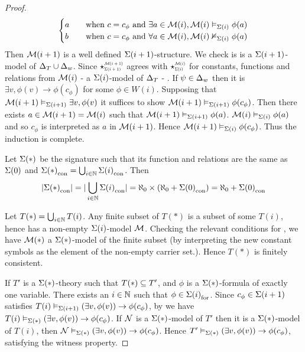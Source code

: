 \begin{proof}
\[\begin{cases}
            a \quad &\text{when } c = c_\phi \text{ and } 
            \exists a \in {\mathcal{M}(i)}, \mathcal{M}(i) \vDash_{\Sigma(i)} \phi(a)\\
            b \quad &\text{when } c = c_\phi \text{ and } 
            \forall a \in {\mathcal{M}(i)}, \mathcal{M}(i) \nvDash_{\Sigma(i)} \phi(a)
        \end{cases}
        \]
    Then $\mathcal{M}(i+1)$ is a well defined $\Sigma(i+1)$-structure.
    We check is is a $\Sigma(i+1)$-model of $\Delta_T \cup \Delta_w$.
    Since 
    $\intp{\Si(i+1)}{\MM(i+1)}$ agrees with 
    $\intp{\Si(i)}{\MM(i)}$ for constants, 
    functions and relations from $\mathcal{M}(i)$ - a $\Sigma(i)$-model
    of $\Delta_T$ -
    .
    If $\psi \in \Delta_w$ then it is 
    $\exists v, \phi(v) \to \phi(c_\phi)$ for some 
    $\phi \in W(i)$.
    Supposing that $\mathcal{M}(i+1) \vDash_{\Sigma(i+1)} \exists v, \phi(v)$
    it suffices to show $\mathcal{M}(i+1) \vDash_{\Sigma(i+1)} \phi(c_\phi)$.
    Then there exists $a \in \mathcal{M}(i + 1) = \mathcal{M}(i)$ such that 
    $\mathcal{M}(i+1) \vDash_{\Sigma(i+1)} \phi(a)$.
     $\mathcal{M}(i) \vDash_{\Sigma(i)} \phi(a)$
    and so $c_\phi$ is interpreted as $a$ in $\mathcal{M}(i+1)$.
    Hence $\mathcal{M}(i + 1) \vDash_{\Sigma(i)} \phi(c_\phi)$.
    Thus the induction is complete.

    Let $\Sigma(*)$ 
    be the signature such that its function and relations 
    are the same as $\Sigma(0)$
    and ${\Sigma(*)}_\mathrm{con} = \bigcup_{i \in \mathbb{N}} {\Sigma(i)}_\mathrm{con}$.
    Then 
    \[
        |{\Sigma(*)}_\mathrm{con}| = |\bigcup_{i \in \mathbb{N}} {\Sigma(i)}_\mathrm{con}| = 
        \aleph_0 \times (\aleph_0 + {\Sigma(0)}_\mathrm{con}) = 
        \aleph_0 + {\Sigma(0)}_\mathrm{con}
    \]

    Let $T(*) = \bigcup_{i \in \mathbb{N}} T(i)$.
    Any finite subset of $T(*)$ is a subset of some $T(i)$, 
    hence has a non-empty $\Sigma(i)$-model $\mathcal{M}$.
    Checking the relevant conditions for
    ,
    we have
    $\mathcal{M}(*)$ a $\Sigma(*)$-model of the finite subset
    (by interpreting the new constant symbols as the 
    element of the non-empty carrier set.).
    Hence $T(*)$ is finitely consistent.
    
    If $T'$ is a $\Sigma(*)$-theory such that $T(*) \subseteq T'$,
    and $\phi$ is a $\Sigma(*)$-formula of exactly one variable.
    There exists an $i \in \mathbb{N}$ such that $\phi \in {\Sigma(i)}_\mathrm{for}$.
    Since $c_\phi \in \Sigma(i+1)$ satisfies 
    $T(i) \vDash_{\Sigma(i+1)} \left(\exists v, \phi(v)\right) \to \phi(c_\phi)$,
    by 
    we have $T(i) \vDash_{\Sigma(*)} \left(\exists v, \phi(v)\right) \to \phi(c_\phi)$.
    If $\mathcal{N}$ is a $\Sigma(*)$-model of $T'$
    then it is a $\Sigma(*)$-model of $T(i)$,
    then $\mathcal{N} \vDash_{\Sigma(*)} \left(\exists v, \phi(v)\right) \to \phi(c_\phi)$.
    Hence $T' \vDash_{\Sigma(*)} \left(\exists v, \phi(v)\right) \to \phi(c_\phi)$,
    satisfying the witness property.
\end{proof}

